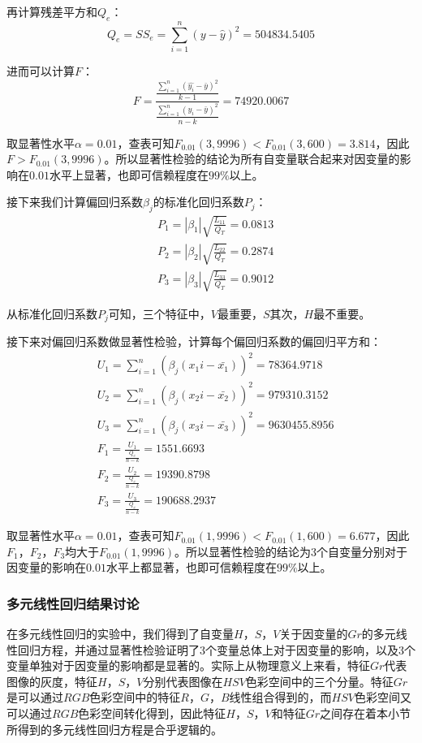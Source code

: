 \documentclass[UTF8]{ctexart}
\begin{document}
	再计算残差平方和$Q_e$：
	\begin{equation*}
	Q_e = SS_e = \sum\limits_{i=1}^{n}(y - \hat{y})^2 = 504834.5405
	\end{equation*}
	
	进而可以计算$F$：
	\begin{equation*}
	F = \frac{\frac{\sum\limits_{i=1}^{n}(\hat{y_i} - \bar{y})^2}{k-1}}{\frac{\sum\limits_{i=1}^{n}(y_i - \bar{y})^2}{n-k}} = 74920.0067
	\end{equation*}
	
	取显著性水平$\alpha=0.01$，查表可知$F_{0.01}(3, 9996) < F_{0.01}(3, 600)=3.814$，因此$F > F_{0.01}(3, 9996)$。所以显著性检验的结论为所有自变量联合起来对因变量的影响在$0.01$水平上显著，也即可信赖程度在$99\%$以上。
	
	接下来我们计算偏回归系数$\beta_j$的标准化回归系数$P_j$：
	\begin{align*}
	& P_1= |\beta_1|\sqrt{\frac{L_{11}}{Q_T}} = 0.0813 \\
	& P_2= |\beta_2|\sqrt{\frac{L_{22}}{Q_T}} = 0.2874\\
	& P_3= |\beta_3|\sqrt{\frac{L_{33}}{Q_T}} = 0.9012
	\end{align*}
	
	从标准化回归系数$P_j$可知，三个特征中，$V$最重要，$S$其次，$H$最不重要。
	
	接下来对偏回归系数做显著性检验，计算每个偏回归系数的偏回归平方和：
	\begin{align*}
	& U_1 = \sum\limits_{i=1}^{n}(\beta_j(x_1i - \bar{x_1}))^2= 78364.9718 \\
	& U_2 = \sum\limits_{i=1}^{n}(\beta_j(x_2i - \bar{x_2}))^2= 979310.3152 \\
	& U_3 = \sum\limits_{i=1}^{n}(\beta_j(x_3i - \bar{x_3}))^2= 9630455.8956 \\
	& F_1 = \frac{U_1}{\frac{Q_e}{n - k}}= 1551.6693 \\
	& F_2 = \frac{U_2}{\frac{Q_e}{n - k}}= 19390.8798 \\
	& F_3 = \frac{U_3}{\frac{Q_e}{n - k}} = 190688.2937
	\end{align*}
	
	取显著性水平$\alpha=0.01$，查表可知$F_{0.01}(1, 9996) < F_{0.01}(1, 600)=6.677$，因此$F_1$，$F_2$，$F_3$均大于$F_{0.01}(1, 9996)$。所以显著性检验的结论为3个自变量分别对于因变量的影响在$0.01$水平上都显著，也即可信赖程度在$99\%$以上。
	
	\subsubsection{多元线性回归结果讨论}
	在多元线性回归的实验中，我们得到了自变量$H$，$S$，$V$关于因变量的$Gr$的多元线性回归方程，并通过显著性检验证明了3个变量总体上对于因变量的影响，以及3个变量单独对于因变量的影响都是显著的。实际上从物理意义上来看，特征$Gr$代表图像的灰度，特征$H$，$S$，$V$分别代表图像在$HSV$色彩空间中的三个分量。特征$Gr$是可以通过$RGB$色彩空间中的特征$R$，$G$，$B$线性组合得到的，而$HSV$色彩空间又可以通过$RGB$色彩空间转化得到，因此特征$H$，$S$，$V$和特征$Gr$之间存在着本小节所得到的多元线性回归方程是合乎逻辑的。
\end{document}
